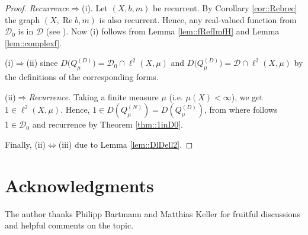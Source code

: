 \documentclass[a4paper,11pt]{amsart}
\theoremstyle{definition}
\renewcommand{\Re}{\operatorname{Re}}%
\newcommand{\D}{\mathcal{D}}
\begin{document}
\begin{proof}

\textit{Recurrence}$\Rightarrow$(i). Let $(X,b,m)$ be recurrent. By Corollary \ref{cor::Rebrec} the graph $(X,\Re b,m)$ is also recurrent. Hence, any real-valued function from $\D_0$ is in $\D$ (see \cite[Theorem 6.1 (i.a)]{KellerLenzWojcBook}). Now (i) follows from Lemma \ref{lem::fRefImfH} and Lemma \ref{lem::complexf}. 

(i)$\Rightarrow$(ii) since $D\big(Q_\mu^{(D)}\big)=\D_0\cap\ell^2(X,\mu)$ and $D\big(Q_\mu^{(D)}\big)=\D\cap\ell^2(X,\mu)$ by the definitions of the corresponding forms.


(ii)$\Rightarrow$\textit{Recurrence}. Taking a finite measure $\mu$ (i.e. $\mu(X)<\infty$), we get $1\in \ell^2(X,\mu)$. Hence, $1\in D(Q_\mu^{(N)})=D(Q_\mu^{(D)})$, from where follows $1\in \D_0$ and recurrence by Theorem \ref{thm::1inD0}.

Finally, (ii)$\Leftrightarrow $(iii) due to Lemma \ref{lem::DlDell2}.


\end{proof}





\section*{Acknowledgments}
The author thanks Philipp Bartmann  and Matthias Keller for fruitful discussions and helpful  comments on the topic.
\end{document}
